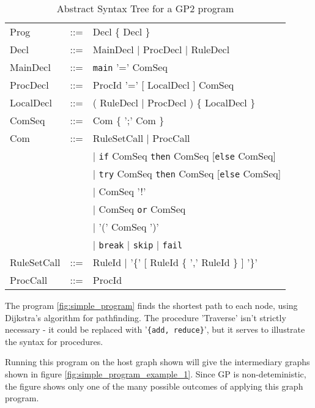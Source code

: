 \documentclass{UoYCSproject}
\begin{document}
\begin{table}
\begin{tabular}{l l l}
Prog        & ::= & Decl \{ Decl \} \\
Decl        & ::= & MainDecl | ProcDecl | RuleDecl \\
MainDecl    & ::= & \texttt{main} '=' ComSeq \\
ProcDecl    & ::= & ProcId '=' [ LocalDecl ] ComSeq \\
LocalDecl   & ::= & ( RuleDecl | ProcDecl ) \{ LocalDecl \} \\
ComSeq      & ::= & Com \{ ';' Com \} \\
Com         & ::= & RuleSetCall | ProcCall \\
            &     & | \texttt{if} ComSeq \texttt{then} ComSeq [\texttt{else} ComSeq] \\
            &     & | \texttt{try} ComSeq \texttt{then} ComSeq [\texttt{else} ComSeq] \\
            &     & | ComSeq '!' \\
            &     & | ComSeq \texttt{or} ComSeq \\
            &     & | '(' ComSeq ')' \\
            &     & | \texttt{break} | \texttt{skip} | \texttt{fail} \\
RuleSetCall & ::= & RuleId | '\{' [ RuleId \{ ',' RuleId \} ] '\}' \\
ProcCall    & ::= & ProcId \\
\end{tabular}
\caption{Abstract Syntax Tree for a GP2 program}
\label{table:gp2_ast}
\end{table}





The program \ref{fig:simple_program} finds the shortest path to each node, using Dijkstra's algorithm for pathfinding. The procedure 'Traverse' isn't strictly necessary - it could be replaced with '\texttt{\{add, reduce\}}', but it serves to illustrate the syntax for procedures. 

Running this program on the host graph shown will give the intermediary graphs shown in figure \ref{fig:simple_program_example_1}. Since GP is non-deteministic, the figure shows only one of the many possible outcomes of applying this graph program.
\end{document}
